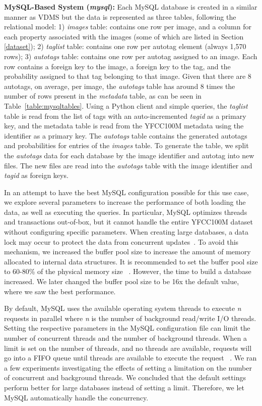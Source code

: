 \textbf{MySQL-Based System (\textit{mysql}):}
Each MySQL database is created in a similar manner as VDMS
but the data is represented as three tables, following the relational model:
1) \textit{images} table: contains one row per image,
and a column for each property
associated with the images (some of which are listed in Section \ref{dataset});
2) \textit{taglist} table: contains one row per autotag element
(always 1,570 rows);
3) \textit{autotags} table: contains one row per autotag
assigned to an image. Each row contains a foreign key to the
image, a foreign key to the tag, and
the probability assigned to that tag belonging to that image.
Given that there are 8 autotags, on average, per image, the \textit{autotags}
table has around 8 times the number of rows present in the
\textit{metadata} table, as can be seen in Table~\ref{table:mysqltables}.
Using a Python client and simple queries, the \textit{taglist}
table is read from the list of tags with an auto-incremented
\textit{tagid} as a primary key, and the metadata table
is read from the YFCC100M metadata using the identifier as a primary key.
The \textit{autotags} table contains the generated autotags and
probabilities for entries of the \textit{images} table.
To generate the table, we split the \textit{autotags} data for each database
by the image identifier and autotag into new files.
The new files are read into the \textit{autotags} table with the image
identifier and \textit{tagid} as foreign keys.

In an attempt to have the best MySQL configuration possible for this use case,
we explore several parameters to increase the performance
of both loading the data, as well as executing the queries.
In particular, MySQL optimizes threads and transactions out-of-box,
but it cannot handle the entire YFCC100M dataset without configuring
specific parameters.
When creating large databases, a data lock may occur to protect the
data from concurrent updates~\cite{mysql_blog}.
To avoid this mechanism, we increased the buffer pool size to
increase the amount of memory allocated to internal data structures.
It is recommended to set the buffer pool size to 60-80\% of the physical
memory size ~\cite{mysql,mysql_blog}.
However, the time to build a database increased.
We later changed  the buffer pool size to be 16x the default value,
where we saw the best performance.

By default, MySQL uses the available operating system threads to
execute \textit{n} requests in parallel where \textit{n} is
the number of background read/write I/O threads.
Setting the respective parameters in the MySQL configuration file can limit the
number of concurrent threads and the number of background threads.
When a limit is set on the number of threads, and no threads are available,
requests will go into a FIFO queue until threads are available to execute
the request ~\cite{mysql,mysql_blog}.
We ran a few experiments investigating the effects of setting a limitation on the
number of concurrent and background threads.
We concluded that the default settings perform better for large databases instead of
setting a limit.
Therefore, we let MySQL automatically handle the concurrency.

